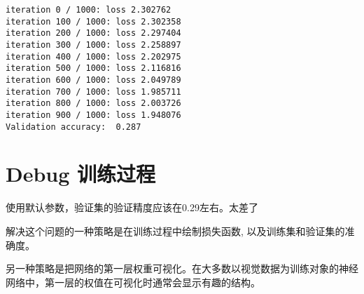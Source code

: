 \documentclass[11pt]{article}
\begin{document}
    \begin{Verbatim}[commandchars=\\\{\}]
iteration 0 / 1000: loss 2.302762
iteration 100 / 1000: loss 2.302358
iteration 200 / 1000: loss 2.297404
iteration 300 / 1000: loss 2.258897
iteration 400 / 1000: loss 2.202975
iteration 500 / 1000: loss 2.116816
iteration 600 / 1000: loss 2.049789
iteration 700 / 1000: loss 1.985711
iteration 800 / 1000: loss 2.003726
iteration 900 / 1000: loss 1.948076
Validation accuracy:  0.287
    \end{Verbatim}

    \hypertarget{debug-ux8badux7ec3ux8fc7ux7a0b}{%
\section{Debug 训练过程}\label{debug-ux8badux7ec3ux8fc7ux7a0b}}

使用默认参数，验证集的验证精度应该在0.29左右。太差了

解决这个问题的一种策略是在训练过程中绘制损失函数,
以及训练集和验证集的准确度。

另一种策略是把网络的第一层权重可视化。在大多数以视觉数据为训练对象的神经网络中，第一层的权值在可视化时通常会显示有趣的结构。
\end{document}
